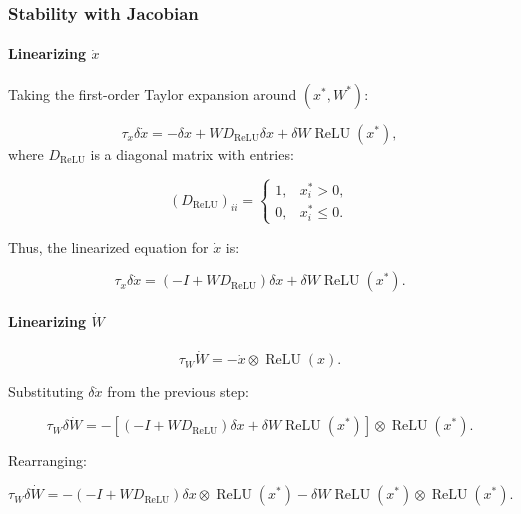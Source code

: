 \documentclass{article}
\theoremstyle{definition} \newtheorem{definition}{Definition}
\theoremstyle{remark} \newtheorem{remark}{Remark}
\newcounter{ct}
\begin{document}
\subsubsection{Stability with Jacobian}
\paragraph{Linearizing $\dot x$}
Taking the first-order Taylor expansion around \( (x^*, W^*) \):

\begin{equation}
    \tau_x \delta \dot{x} = -\delta x + W D_{\operatorname{ReLU}} \delta x + \delta W \operatorname{ReLU}(x^*),
\end{equation}
where \( D_{\operatorname{ReLU}} \) is a diagonal matrix with entries:

\begin{equation}
    (D_{\operatorname{ReLU}})_{ii} =
    \begin{cases}
        1, & x^*_i > 0, \\
        0, & x^*_i \leq 0.
    \end{cases}
\end{equation}

Thus, the linearized equation for \( \dot{x} \) is:

\begin{equation}
    \tau_x \delta \dot{x} = (-I + W D_{\operatorname{ReLU}}) \delta x + \delta W \operatorname{ReLU}(x^*).
\end{equation}


\paragraph{Linearizing $\dot W$}

\begin{equation}
    \tau_W \dot{W} = - \dot{x} \otimes \operatorname{ReLU}(x).
\end{equation}

Substituting \( \delta \dot{x} \) from the previous step:

\begin{equation}
    \tau_W \delta \dot{W} = -\left[ (-I + W D_{\operatorname{ReLU}}) \delta x + \delta W \operatorname{ReLU}(x^*) \right] \otimes \operatorname{ReLU}(x^*).
\end{equation}

Rearranging:

\begin{equation}
    \tau_W \delta \dot{W} = - (-I + W D_{\operatorname{ReLU}}) \delta x \otimes \operatorname{ReLU}(x^*) 
    - \delta W \operatorname{ReLU}(x^*) \otimes \operatorname{ReLU}(x^*).
\end{equation}
\end{document}
